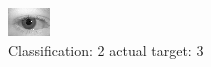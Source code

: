 \begin{figure}[h!]
\begin{center}
\includegraphics[width=0.60\columnwidth]{figures/ID544_class_2_target_3.png}
\end{center}
\caption{ Classification: 2 actual target: 3}
\label{fig:ID544_class_2_target_3}
\end{figure}
